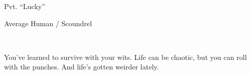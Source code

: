 \documentclass{article}
\newcommand{\Bra}{2}
\newcommand{\Agi}{4}
\newcommand{\Int}{2}
\newcommand{\Cun}{3}
\newcommand{\Wil}{2}
\newcommand{\Pre}{2}
\begin{document}
\begin{minipage}{0.6\linewidth}
{\Huge Pvt. ``Lucky'' }

{\large Average Human / Scoundrel}

\vspace{1.5em}

\end{minipage}\hfill%
\\

\vspace{0em}\raggedright


You've learned to survive with your wits.  Life can be chaotic, but you can roll with the punches.  And life's gotten weirder lately.



\begin{center}
\Characteristics{\Bra}{\Agi}{\Int}{\Cun}{\Wil}{\Pre}

\noindent\null\hfill{}\quad
{}\null\quad
{}\quad
{}\hfill\null
{}\quad
\end{center}


\vspace{0.5em}



\vspace{-3em}
\end{document}
